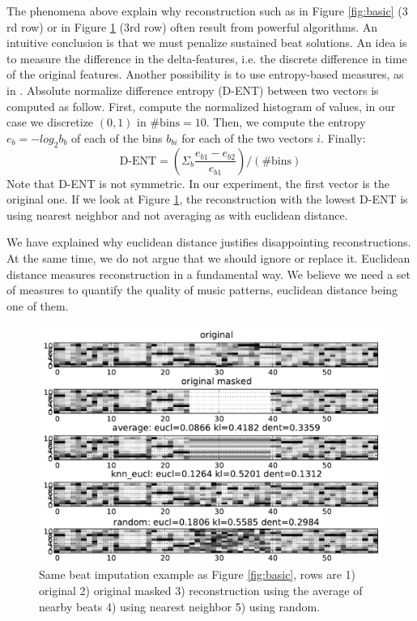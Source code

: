 \documentclass{article}
\begin{document}
The phenomena above explain why reconstruction such as
in Figure \ref{fig:basic} ($3$rd row) or in Figure \ref{fig:avgnnrand}
($3$rd row) often result from powerful algorithms. An intuitive
conclusion is that we must penalize sustained beat solutions.
An idea is to measure the difference in the delta-features, i.e.
the discrete difference in time of the original features.
Another possibility is to use entropy-based measures, as in
\cite{Mentzelopoulos2004}.
Absolute normalize difference entropy (D-ENT)
between two vectors is computed as follow. First, compute the normalized histogram 
of values, in our case we discretize $(0,1)$ in $\mbox{\# bins} = 10$. 
Then, we compute the entropy
$e_b = - log_2 b_b$ of each of the bins $b_{bi}$ for each of the two vectors $i$. Finally:
\[
\mbox{D-ENT} = \left( \Sigma_b \frac{e_{b1} - e_{b2}}{e_{b1}} \right) / (\mbox{\# bins})
\]
Note that D-ENT is not symmetric. In our experiment, the first vector is the original one.
If we look at Figure \ref{fig:avgnnrand}, the reconstruction with the lowest D-ENT is using
nearest neighbor and not averaging as with euclidean distance.

We have explained why euclidean distance justifies disappointing reconstructions. At the same
time, we do not argue that we should ignore or replace it. Euclidean distance measures
reconstruction in a fundamental way. We believe we need a set of measures to quantify the
quality of music patterns, euclidean distance being one of them.

\begin{figure}[t]
\begin{center}
\includegraphics[width=.95\columnwidth]{avg_nn_rand}
\end{center}
\caption{Same beat imputation example as Figure \ref{fig:basic}, 
rows are 1) original 2) original masked
3) reconstruction using the average of nearby beats 4) using
nearest neighbor 5) using random.
\label{fig:avgnnrand}}
\end{figure}
\end{document}
